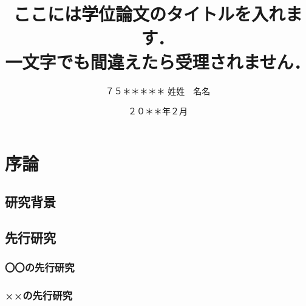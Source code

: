 \documentclass[openany,oneside,paper=a4paper,book,fontsize=12pt,jafontsize=12pt]{jlreq}
\begin{document}
\frontmatter

\title{ここには学位論文のタイトルを入れます．\\ 一文字でも間違えたら受理されません．}
\date{２０＊＊年２月}
\author{
７５＊＊＊＊＊
\zw %
姓姓　名名
} %

\makecover

\pagestyle{empty}
\def\thepage{}
\tableofcontents

\signary

\lipsum[1-8]


\mainmatter
\newpage
\setcounter{page}{0}

\chapter{序論}
\label{ch:introduction}

\lipsum[1]

\section{研究背景}
\label{sec:background}

\lipsum[1-8]

\section{先行研究}
\label{sec:previous}

\lipsum[1-2]

\subsection{〇〇の先行研究}
\label{ssec:marumaru}

\lipsum[1-4]

\subsection{××の先行研究}
\label{ssec:batsubatsu}
\end{document}
